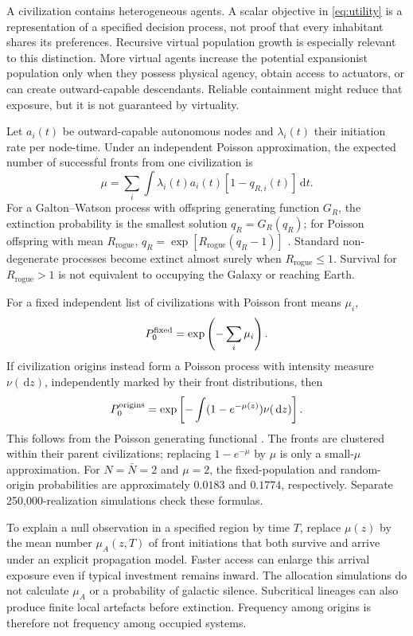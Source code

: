 \documentclass[11pt,a4paper]{article}
\theoremstyle{definition}\newtheorem{definition}{Definition}
\newcommand{\dd}{\,\mathrm{d}}
\newcommand{\Rogue}{R_{\mathrm{rogue}}}
\begin{document}
A civilization contains heterogeneous agents. A scalar objective in \cref{eq:utility} is a representation of a specified decision process, not proof that every inhabitant shares its preferences. Recursive virtual population growth is especially relevant to this distinction. More virtual agents increase the potential expansionist population only when they possess physical agency, obtain access to actuators, or can create outward-capable descendants. Reliable containment might reduce that exposure, but it is not guaranteed by virtuality.

Let $a_i(t)$ be outward-capable autonomous nodes and $\lambda_i(t)$ their initiation rate per node-time. Under an independent Poisson approximation, the expected number of successful fronts from one civilization is
\begin{equation}
 \mu=\sum_i\int\lambda_i(t)a_i(t)[1-q_{R,i}(t)]\dd t.
 \label{eq:mu}
\end{equation}
For a Galton--Watson process with offspring generating function $G_R$, the extinction probability is the smallest solution $q_R=G_R(q_R)$; for Poisson offspring with mean $\Rogue$, $q_R=\exp[\Rogue(q_R-1)]$ \citep{Harris1963}. Standard non-degenerate processes become extinct almost surely when $\Rogue\leq1$. Survival for $\Rogue>1$ is not equivalent to occupying the Galaxy or reaching Earth.

For a fixed independent list of civilizations with Poisson front means $\mu_i$,
\begin{equation}
 P_0^{\rm fixed}=\exp\left(-\sum_i\mu_i\right).
 \label{eq:fixed}
\end{equation}
If civilization origins instead form a Poisson process with intensity measure $\nu(\dd z)$, independently marked by their front distributions, then
\begin{equation}
 P_0^{\rm origins}=\exp\left[-\int(1-e^{-\mu(z)})\nu(\dd z)\right].
 \label{eq:origins}
\end{equation}
This follows from the Poisson generating functional \citep{LastPenrose2017}. The fronts are clustered within their parent civilizations; replacing $1-e^{-\mu}$ by $\mu$ is only a small-$\mu$ approximation. For $N=\bar N=2$ and $\mu=2$, the fixed-population and random-origin probabilities are approximately $0.0183$ and $0.1774$, respectively. Separate 250,000-realization simulations check these formulas.

To explain a null observation in a specified region by time $T$, replace $\mu(z)$ by the mean number $\mu_A(z,T)$ of front initiations that both survive and arrive under an explicit propagation model. Faster access can enlarge this arrival exposure even if typical investment remains inward. The allocation simulations do not calculate $\mu_A$ or a probability of galactic silence. Subcritical lineages can also produce finite local artefacts before extinction. Frequency among origins is therefore not frequency among occupied systems.
\end{document}
